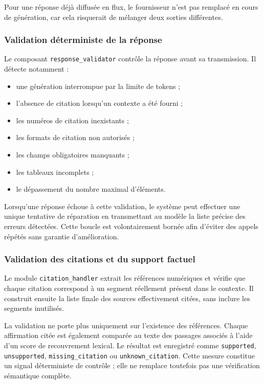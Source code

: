 Pour une réponse déjà diffusée en flux, le fournisseur n'est pas remplacé en cours de
génération, car cela risquerait de mélanger deux sorties différentes.

\subsubsection{Validation déterministe de la réponse}

Le composant \texttt{response\_validator} contrôle la réponse avant sa transmission.
Il détecte notamment :

\begin{itemize}
  \item une génération interrompue par la limite de tokens ;
  \item l'absence de citation lorsqu'un contexte a été fourni ;
  \item les numéros de citation inexistants ;
  \item les formats de citation non autorisés ;
  \item les champs obligatoires manquants ;
  \item les tableaux incomplets ;
  \item le dépassement du nombre maximal d'éléments.
\end{itemize}

Lorsqu'une réponse échoue à cette validation, le système peut effectuer une unique
tentative de réparation en transmettant au modèle la liste précise des erreurs
détectées. Cette boucle est volontairement bornée afin d'éviter des appels répétés
sans garantie d'amélioration.

\subsubsection{Validation des citations et du support factuel}

Le module \texttt{citation\_handler} extrait les références numériques et vérifie que
chaque citation correspond à un segment réellement présent dans le contexte. Il
construit ensuite la liste finale des sources effectivement citées, sans inclure les
segments inutilisés.

La validation ne porte plus uniquement sur l'existence des références. Chaque
affirmation citée est également comparée au texte des passages associés à l'aide d'un
score de recouvrement lexical. Le résultat est enregistré comme
\texttt{supported}, \texttt{unsupported}, \texttt{missing\_citation} ou
\texttt{unknown\_citation}. Cette mesure constitue un signal déterministe de contrôle ;
elle ne remplace toutefois pas une vérification sémantique complète.

